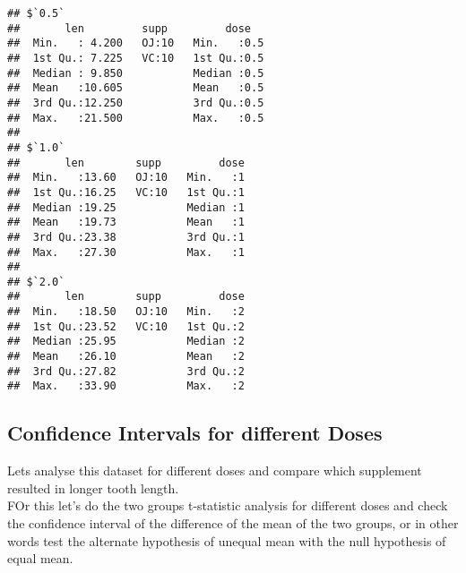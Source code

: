 \documentclass[
]{article}
\newenvironment{Shaded}{\begin{snugshade}}{\end{snugshade}}
\newcommand{\ControlFlowTok}[1]{\textcolor[rgb]{0.13,0.29,0.53}{\textbf{#1}}}
\newcommand{\DataTypeTok}[1]{\textcolor[rgb]{0.13,0.29,0.53}{#1}}
\newcommand{\DecValTok}[1]{\textcolor[rgb]{0.00,0.00,0.81}{#1}}
\newcommand{\FloatTok}[1]{\textcolor[rgb]{0.00,0.00,0.81}{#1}}
\newcommand{\KeywordTok}[1]{\textcolor[rgb]{0.13,0.29,0.53}{\textbf{#1}}}
\newcommand{\NormalTok}[1]{#1}
\newcommand{\OperatorTok}[1]{\textcolor[rgb]{0.81,0.36,0.00}{\textbf{#1}}}
\newcommand{\StringTok}[1]{\textcolor[rgb]{0.31,0.60,0.02}{#1}}
\begin{document}
\begin{verbatim}
## $`0.5`
##       len         supp         dose    
##  Min.   : 4.200   OJ:10   Min.   :0.5  
##  1st Qu.: 7.225   VC:10   1st Qu.:0.5  
##  Median : 9.850           Median :0.5  
##  Mean   :10.605           Mean   :0.5  
##  3rd Qu.:12.250           3rd Qu.:0.5  
##  Max.   :21.500           Max.   :0.5  
## 
## $`1.0`
##       len        supp         dose  
##  Min.   :13.60   OJ:10   Min.   :1  
##  1st Qu.:16.25   VC:10   1st Qu.:1  
##  Median :19.25           Median :1  
##  Mean   :19.73           Mean   :1  
##  3rd Qu.:23.38           3rd Qu.:1  
##  Max.   :27.30           Max.   :1  
## 
## $`2.0`
##       len        supp         dose  
##  Min.   :18.50   OJ:10   Min.   :2  
##  1st Qu.:23.52   VC:10   1st Qu.:2  
##  Median :25.95           Median :2  
##  Mean   :26.10           Mean   :2  
##  3rd Qu.:27.82           3rd Qu.:2  
##  Max.   :33.90           Max.   :2
\end{verbatim}

\hypertarget{confidence-intervals-for-different-doses}{%
\subsection{Confidence Intervals for different
Doses}\label{confidence-intervals-for-different-doses}}

Lets analyse this dataset for different doses and compare which
supplement resulted in longer tooth length.\\
FOr this let's do the two groups t-statistic analysis for different
doses and check the confidence interval of the difference of the mean of
the two groups, or in other words test the alternate hypothesis of
unequal mean with the null hypothesis of equal mean.

\begin{Shaded}
\end{Shaded}
\end{document}
